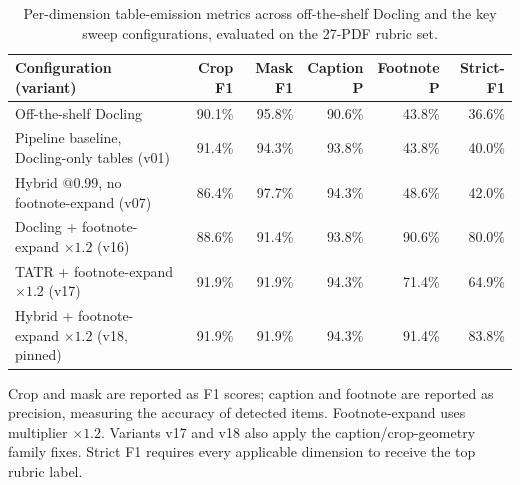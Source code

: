 \begin{table}[htpb]
    \caption[Per-dimension table-emission metrics]{Per-dimension table-emission metrics across off-the-shelf Docling and the key sweep configurations, evaluated on the 27-PDF rubric set.}

    \label{tab:table-emission-metrics}
    \centering
    \small
    \begin{tabular}{@{}l r r r r r@{}}
        \toprule
        Configuration (variant)
            & Crop F1
            & Mask F1
            & \makecell[r]{Caption\\P}
            & \makecell[r]{Footnote\\P}
            & Strict-F1 \\
        \midrule
        
        Off-the-shelf Docling
          & 90.1\%
          & 95.8\%
          & 90.6\%
          & 43.8\%
          & 36.6\% \\
        \midrule
        
        \makecell[l]{Pipeline baseline,\\Docling-only tables (v01)} 
            & 91.4\%
            & 94.3\%
            & 93.8\%
            & 43.8\%
            & 40.0\% \\
            
        \makecell[l]{Hybrid @0.99, no\\footnote-expand (v07)}
            & 86.4\%
            & 97.7\%
            & 94.3\%
            & 48.6\%
            & 42.0\% \\
            
        \makecell[l]{Docling + footnote-expand\\$\times 1.2$ (v16)}
            & 88.6\%
            & 91.4\%
            & 93.8\%
            & 90.6\%
            & 80.0\% \\
            
        \makecell[l]{TATR + footnote-expand\\$\times 1.2$ (v17)}
            & 91.9\%
            & 91.9\%
            & 94.3\%
            & 71.4\%
            & 64.9\% \\
            
        \makecell[l]{Hybrid + footnote-expand\\$\times 1.2$ (v18, pinned)}
            & 91.9\%
            & 91.9\%
            & 94.3\%
            & 91.4\%
            & 83.8\% \\
            
        \bottomrule
    \end{tabular}

    \vspace{0.35em}
    \begin{minipage}{0.95\textwidth}
        \footnotesize
        Crop and mask are reported as F1 scores; caption and footnote are reported as precision, measuring the accuracy of detected items. Footnote-expand uses multiplier $\times 1.2$. Variants v17 and v18 also apply the caption/crop-geometry family fixes. Strict F1 requires every applicable dimension to receive the top rubric label.
    \end{minipage}
\end{table}


